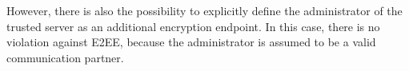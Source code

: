 \documentclass[../main.tex]{subfiles}
\begin{document}
However, there is also the possibility to explicitly define the administrator of the trusted server as an additional encryption endpoint.
In this case, there is no violation against E2EE, because the administrator is assumed to be a valid communication partner.








\end{document}
